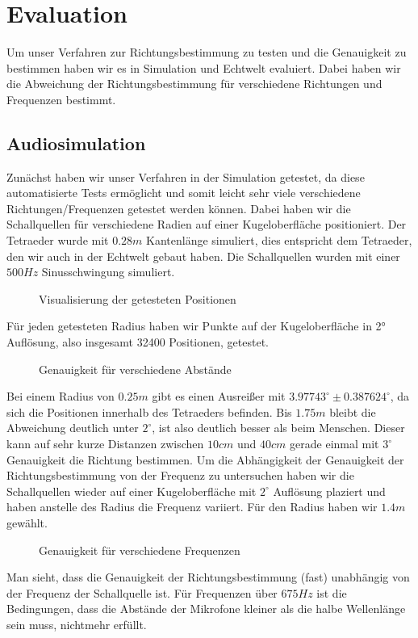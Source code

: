 \section{Evaluation}
Um unser Verfahren zur Richtungsbestimmung zu testen und die Genauigkeit zu bestimmen haben wir es in Simulation und Echtwelt evaluiert. Dabei haben wir die Abweichung der Richtungsbestimmung für verschiedene Richtungen und Frequenzen bestimmt.
\subsection{Audiosimulation}
Zunächst haben wir unser Verfahren in der Simulation getestet, da diese automatisierte Tests ermöglicht und somit leicht sehr viele verschiedene Richtungen/Frequenzen getestet werden können. Dabei haben wir die Schallquellen für verschiedene Radien auf einer Kugeloberfläche positioniert. Der Tetraeder wurde mit $0.28m$ Kantenlänge simuliert, dies entspricht dem Tetraeder, den wir auch in der Echtwelt gebaut haben. Die Schallquellen wurden mit einer $500Hz$ Sinusschwingung simuliert.
\begin{figure}[H]
  \centering
  
  \caption{Visualisierung der getesteten Positionen}
  \label{fig:pos}
\end{figure}
Für jeden getesteten Radius haben wir Punkte auf der Kugeloberfläche in 2° Auflösung, also insgesamt 32400 Positionen, getestet.
\begin{figure}[H]
  \centering
  
  \caption{Genauigkeit für verschiedene Abstände}
  \label{fig:pos_sweep}
\end{figure}
Bei einem Radius von $0.25m$ gibt es einen Ausreißer mit $3.97743^\circ \pm 0.387624^\circ$, da sich die Positionen innerhalb des Tetraeders befinden. Bis $1.75m$ bleibt die Abweichung deutlich unter $2^\circ$, ist also deutlich besser als beim Menschen. Dieser kann auf sehr kurze Distanzen zwischen $10cm$ und $40cm$ gerade einmal mit $3^\circ$ Genauigkeit die Richtung bestimmen. \cite{middlebrooks1991sound}
Um die Abhängigkeit der Genauigkeit der Richtungsbestimmung von der Frequenz zu untersuchen haben wir die Schallquellen wieder auf einer Kugeloberfläche mit $2^\circ$ Auflösung plaziert und haben anstelle des Radius die Frequenz variiert. Für den Radius haben wir $1.4m$ gewählt.
\begin{figure}[H]
  \centering
  
  \caption{Genauigkeit für verschiedene Frequenzen}
  \label{fig:freq_seep}
\end{figure}
Man sieht, dass die Genauigkeit der Richtungsbestimmung (fast) unabhängig von der Frequenz der Schallquelle ist. Für Frequenzen über $675Hz$ ist die Bedingungen, dass die Abstände der Mikrofone kleiner als die halbe Wellenlänge sein muss, nichtmehr erfüllt.
